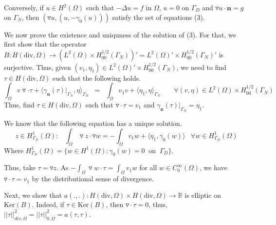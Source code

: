 \documentclass[12pt]{article}
\begin{document}
Conversely, if $u\in H^2(\Omega)$ such that $-\Delta u=f$ in $\Omega$, $u=0$ on $\Gamma_D$ and $\triangledown u\cdot \textbf{n}=g$ on $\Gamma_N$, then $(\triangledown u,(u,-\gamma_0(u)))$ satisfy the set of equations (3).


\iftrue
We now prove the existence and uniquness of the solution of (3). For that, we first show that the operator $B:H(\text{div},\Omega)\to(L^2(\Omega)\times H^{1/2}_{00}(\Gamma_N))'=L^2(\Omega)'\times H^{1/2}_{00}(\Gamma_N)'$ is surjective. Thus, given $(v_1,\eta_1)\in L^2(\Omega)'\times H^{1/2}_{00}(\Gamma_N)$, we need to find $\tau\in H(\text{div},\Omega)$ such that the following holds.
$$
\int_{\Omega}v\triangledown\cdot\tau +  \langle \gamma_{\textbf{n}}(\tau)|_{\Gamma_N},\eta \rangle _{\Gamma_N} \;\;=\;\; \int_{\Omega}v_1v+ \langle \eta_1,\eta \rangle _{\Gamma_N}\;\;\;\;\;\;\;\forall (v,\eta) \in L^2(\Omega)\times H^{1/2}_{00}(\Gamma_N)
$$
Thus, find $\tau\in H(\text{div},\Omega)$ such that $\triangledown \cdot \tau=v_1$ and $\gamma_{\textbf{n}}(\tau)|_{\Gamma_N}=\eta_1$.

We know that the following equation has a unique solution.
$$
z\in  H^1_{\Gamma_D}(\Omega):\;\;\;\int_{\Omega}\triangledown z\cdot \triangledown w=-\int_{\Omega}v_1w+ \langle \eta_1,\gamma_0(w) \rangle\;\;\;\forall w\in H^1_{\Gamma_D}(\Omega)
$$
Where $H^1_{\Gamma_D}(\Omega)=\{w\in H^1(\Omega):\gamma_0(w)=0\;\;\text{on}\;\;\Gamma_D\}$.

Thus, take $\tau=\triangledown z$. As $-\int_{\Omega}\triangledown w \cdot \tau =\int_{\Omega}v_1w$ for all $w\in C^{\infty}_0(\Omega)$, we have $\triangledown \cdot \tau=v_1$ by the distributional sense of divergence.

Next, we show that $a(.,.):H(\text{div},\Omega)\times H(\text{div},\Omega)\to \mathbb{R}$ is elliptic on $\text{Ker}(B)$. Indeed, if $\tau \in \text{Ker}(B)$, then $\triangledown \cdot \tau=0$, thus, $||\tau||^2_{div,\Omega}=||\tau||^2_{0,\Omega}=a(\tau,\tau)$.
\fi
\end{document}
